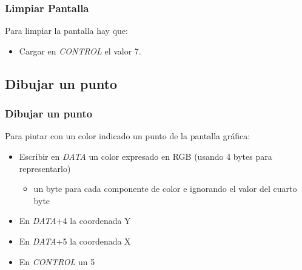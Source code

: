\documentclass{beamer}
\begin{document}
\begin{frame}
\frametitle{Limpiar Pantalla}
Para limpiar la pantalla hay que:
\begin{itemize}
\item Cargar en \emph{CONTROL} el valor 7.
\end{itemize}
\end{frame}


\subsection{Dibujar un punto}

\begin{frame}
\frametitle{Dibujar un punto}
Para pintar con un color indicado un punto de la pantalla gráfica: 
\begin{itemize}
\item Escribir en \emph{DATA} un color expresado en RGB (usando 4 bytes para representarlo)
\begin{itemize}
\item un byte para cada componente de color e ignorando el valor del cuarto byte
\end{itemize}
\item En \emph{DATA}+4 la coordenada Y
\item En \emph{DATA}+5 la coordenada X 
\item En \emph{CONTROL} un 5
\end{itemize}

\end{frame}
\end{document}
